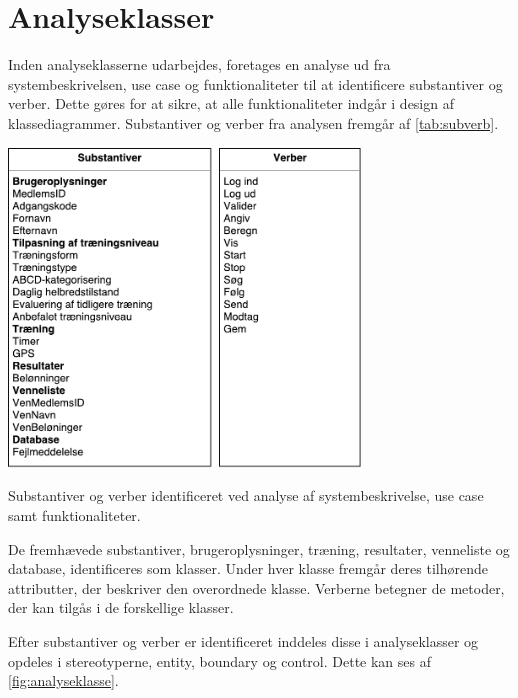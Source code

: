 \section{Analyseklasser}
Inden analyseklasserne udarbejdes, foretages en analyse ud fra systembeskrivelsen, use case og funktionaliteter til at identificere substantiver og verber. Dette gøres for at sikre, at alle funktionaliteter indgår i design af klassediagrammer. Substantiver og verber fra analysen fremgår af \autoref{tab:subverb}.

\begin{table}[H]
\centering
\includegraphics[width=0.7\textwidth]{figures/aktivitetsdiagram/substantiveverber}
\caption{Substantiver og verber identificeret ved analyse af systembeskrivelse, use case samt funktionaliteter.}
\label{tab:subverb}
\end{table}

\noindent
De fremhævede substantiver, brugeroplysninger, træning, resultater, venneliste og database, identificeres som klasser. Under hver klasse fremgår deres tilhørende attributter, der beskriver den overordnede klasse. Verberne betegner de metoder, der kan tilgås i de forskellige klasser. 

Efter substantiver og verber er identificeret inddeles disse i analyseklasser og opdeles i stereotyperne, entity, boundary og control. Dette kan ses af \autoref{fig:analyseklasse}. 

